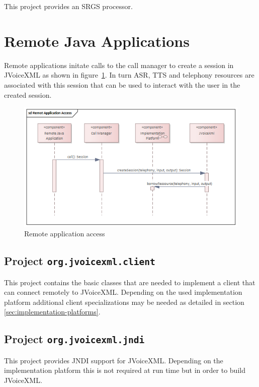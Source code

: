 \documentclass[11pt,a4paper]{article}
\begin{document}
This project provides an SRGS processor.

\section{Remote Java Applications}

Remote applications initate calls to the call manager to create a session in JVoiceXML
as shown in figure~\ref{fig:remote-application-access}. In turn ASR, TTS and telephony resources
are associated with this session that can be used to interact with the user in the created session.
\begin{figure}
\includegraphics[width=\linewidth]{remote-application-access.png}
\caption{Remote application access}
\label{fig:remote-application-access}
\end{figure}

\subsection{Project \texttt{org.jvoicexml.client}}

This project contains the basic classes that are needed to implement a
client that can connect remotely to JVoiceXML. Depending on the used 
implementation platform additional client specializations may be needed
as detailed in section \ref{sec:implementation-platforms}.

\subsection{Project \texttt{org.jvoicexml.jndi}}
\label{sec:jndi}

This project provides JNDI support for JVoiceXML. Depending on the implementation platform this is not required at run
time but in order to build JVoiceXML.
\end{document}
